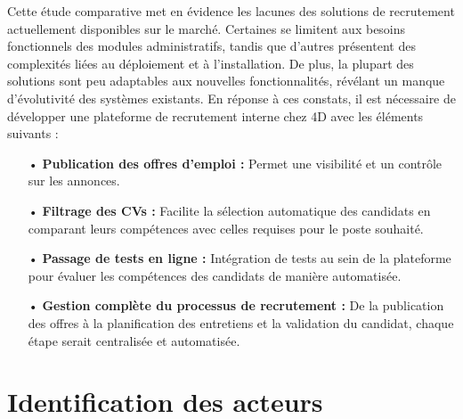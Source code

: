 Cette étude comparative met en évidence les lacunes des solutions de recrutement actuellement disponibles 
sur le marché. Certaines se limitent aux besoins fonctionnels des modules administratifs, tandis que d'autres 
présentent des complexités liées au déploiement et à l'installation. De plus, la plupart des solutions sont peu 
adaptables aux nouvelles fonctionnalités, révélant un manque d'évolutivité des systèmes existants.
En réponse à ces constats, il est nécessaire de développer une plateforme de recrutement interne chez 4D
 avec les éléments suivants : \\

\begin{spacing}{1.1}
\begin{itemize}
   \item[ • ] \textbf{Publication des offres d'emploi :} Permet une visibilité et un contrôle sur les annonces.
   \item[ • ] \textbf{Filtrage des CVs :} Facilite la sélection automatique des candidats en comparant leurs compétences avec celles requises pour le poste souhaité. 
   \item[ • ] \textbf{Passage de tests en ligne :}  Intégration de tests au sein de la plateforme pour évaluer les compétences des candidats de manière automatisée.
   \item[ • ] \textbf{Gestion complète du processus de recrutement :}  De la publication des offres à la planification des entretiens et la validation du candidat, chaque étape serait centralisée et automatisée. 
\end{itemize} 
\end{spacing}
\section{Identification des acteurs}


